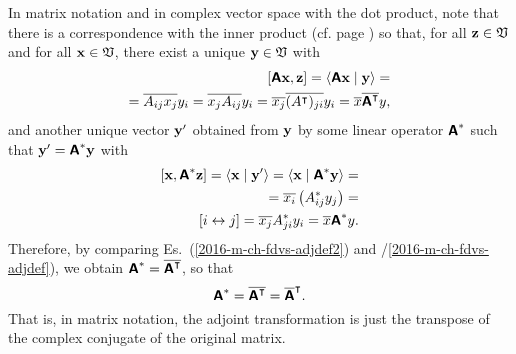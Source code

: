 In matrix notation and in complex vector space with the dot product,
note that there is a correspondence with the inner product
(cf. page \pageref{2011-m-corr-bil-ip})
so that, for all ${\bf z}\in {\frak V}$ and for all ${\bf x}\in {\frak V}$,
there exist a unique ${\bf y}\in {\frak V}$ with
\begin{equation}
\begin{split}
[\textsf{\textbf{A}}{\bf x}, {\bf z}]
=\langle \textsf{\textbf{A}} {\bf x}\mid {\bf y}\rangle
= \\
=\overline{A_{ij}   x_j}  y_i
=  \overline{x_j A_{ij}} y_i
= \overline{x_j} \overline{(A^\intercal )_{ji}}  y_i
= \overline{ x}  \overline{ \textsf{\textbf{A}}^\intercal}  y ,
\end{split}
\label{2016-m-ch-fdvs-adjdef}
\end{equation}
and another unique vector ${\bf y}'$ obtained from ${\bf y}$ by
some linear operator $\textsf{\textbf{A}}^\ast$
such that ${\bf y}'=\textsf{\textbf{A}}^\ast {\bf y}$ with
\begin{equation}
\begin{split}
[{\bf x}, \textsf{\textbf{A}}^\ast {\bf z}]
= \langle {\bf x}\mid {\bf y}'\rangle
= \langle {\bf x}\mid \textsf{\textbf{A}}^\ast {\bf y}\rangle
=\\
= \overline{ x_i } \left(A_{ij}^\ast y_j \right)
=\\
[ i \leftrightarrow j]
= \overline{  x_j }A_{ji}^\ast    y_i
=   \overline{ x }\textsf{\textbf{A}}^\ast y.
\end{split}
\label{2016-m-ch-fdvs-adjdef2}
\end{equation}
Therefore, by comparing Es.~(\ref{2016-m-ch-fdvs-adjdef2}) and /\ref{2016-m-ch-fdvs-adjdef}),  we obtain $\textsf{\textbf{A}}^\ast=\overline{ \textsf{\textbf{A}}^\intercal }$, so that
\begin{equation}
\textsf{\textbf{A}}^\ast =\overline{\textsf{\textbf{A}}^\intercal } = \overline{\textsf{\textbf{A}}}^\intercal .
\end{equation}
That is, in matrix notation, the adjoint transformation is just the
transpose of the complex conjugate of the original matrix.

